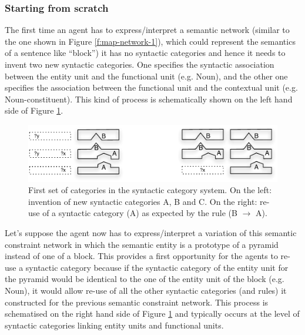 \subsubsection*{Starting from scratch}

The first time an agent has to express/interpret a semantic network
(similar to the one shown in Figure \ref{f:map-network-1}), which
could represent the semantics of a sentence like ``block'') it has no
syntactic categories and hence it needs to invent two new syntactic
categories. One specifies the syntactic association between the entity
unit and the functional unit (e.g. Noun), and the other one specifies
the association between the functional unit and the contextual unit
(e.g. Noun-constituent). This kind of process is schematically shown
on the left hand side of Figure \ref{f:map-syntactic-categories-1}.

\begin{figure}[htbp]
  \begin{center}
    \includegraphics[width=\textwidth]{./composition/figures/mapping-1.pdf}
    \caption[First set of categories in the syntactic category
    system]{First set of categories in the syntactic category system. On
      the left: invention of new syntactic categories A, B and C. On
      the right: re-use of a syntactic category (A) as expected by the
      rule (B $\rightarrow$ A).}
    \label{f:map-syntactic-categories-1}
  \end{center}
\end{figure}

Let's suppose the agent now has to express/interpret a variation of
this semantic constraint network in which the semantic entity is a
prototype of a pyramid instead of one of a block. This provides a
first opportunity for the agents to re-use a syntactic category because
if the syntactic category of the entity unit for the pyramid would be
identical to the one of the entity unit of the block (e.g. Noun), it
would allow re-use of all the other syntactic categories (and rules) it
constructed for the previous semantic constraint network. This process
is schematised on the right hand side of Figure
\ref{f:map-syntactic-categories-1} and typically occurs at the level
of syntactic categories linking entity units and functional units.

